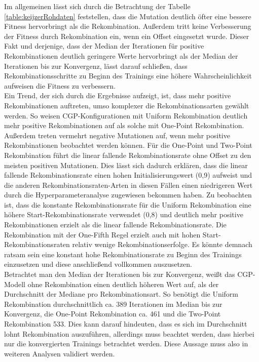 Im allgemeinen lässt sich durch die Betrachtung der Tabelle \ref{table:keijzerRohdaten} feststellen, dass die Mutation deutlich öfter eine bessere Fitness hervorbringt als die Rekombination.
Außerdem tritt keine Verbesserung der Fitness durch Rekombination ein, wenn ein Offset eingesetzt wurde.
Dieser Fakt und derjenige, dass der Median der Iterationen für positive Rekombinationen deutlich geringere Werte hervorbringt als der Median der Iterationen bis zur Konvergenz, lässt darauf schließen, dass Rekombinationsschritte zu Beginn des Trainings eine höhere Wahrscheinlichkeit aufweisen die Fitness zu verbessern.\\
Ein Trend, der sich durch die Ergebnisse aufzeigt, ist, dass mehr positive Rekombinationen auftreten, umso komplexer die Rekombinationsarten gewählt werden.
So weisen CGP-Konfigurationen mit Uniform Rekombination deutlich mehr positive Rekombinationen auf als solche mit One-Point Rekombination.
Außerdem treten vermehrt negative Mutationen auf, wenn mehr positive Rekombinationen beobachtet werden können.
Für die One-Point und Two-Point Rekombination führt die linear fallende Rekombinationsrate ohne Offset zu den meisten positiven Mutationen.
Dies lässt sich dadurch erklären, dass die linear fallende Rekombinationsrate einen hohen Initialisierungswert (0,9) aufweist und die anderen Rekombinationsraten-Arten in diesen Fällen einen niedrigeren Wert durch die Hyperparameteranalyse zugewiesen bekommen haben.
Zu beobachten ist, dass die konstante Rekombinationsrate für die Uniform Rekombination eine höhere Start-Rekombinationsrate verwendet (0,8) und deutlich mehr positive Rekombinationen erzielt als die linear fallende Rekombinationsrate.
Die Rekombination mit der One-Fifth Regel erzielt auch mit hohen Start-Rekombinationsraten relativ wenige Rekombinationserfolge.
Es könnte demnach ratsam sein eine konstant hohe Rekombinationsrate zu Beginn des Trainings einzusetzen und diese anschließend vollkommen auszusetzen.\\
Betrachtet man den Median der Iterationen bis zur Konvergenz, weißt das CGP-Modell ohne Rekombination einen deutlich höheren Wert auf, als der Durchschnitt der Mediane pro Rekombinationsart. 
So benötigt die Uniform Rekombination durchschnittlich ca. 389 Iterationen im Median bis zur Konvergenz, die One-Point Rekombination ca. 461 und die Two-Point Rekombination 533.
Dies kann darauf hindeuten, dass es sich im Durchschnitt lohnt Rekombination auszuführen, allerdings muss beachtet werden, dass hierbei nur die konvergierten Trainings betrachtet werden.
Diese Aussage muss also in weiteren Analysen validiert werden.\\
